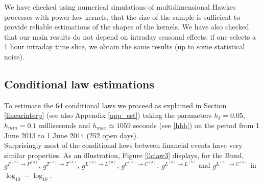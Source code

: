 \documentclass[a4paper,11pt]{article}
\newcommand{\PA}{P^{(a)}}
\newcommand{\PB}{P^{(b)}}
\newcommand{\TA}{T^{(a)}}
\newcommand{\CA}{C^{(a)}}
\newcommand{\LA}{L^{(a)}}
\newcommand{\LB}{L^{(b)}}
\begin{document}
\noindent We have checked using numerical simulations of multidimensional Hawkes processes with power-law kernels, that the size of the sample is sufficient to provide reliable estimations of the shapes of the kernels. We have also checked that our main results do not depend on intraday seasonal effects: if one selects a 1 hour intraday time slice, we obtain the same results (up to some statistical noise).



\subsection{Conditional law estimations}
\label{sec:claw}
To estimate the 64 conditional laws we proceed as explained in
Section \ref{linearinterp} (see also
Appendix \ref{app_est}) taking the parameters $h_\delta=0.05$, $h_{min}=0.1$ milliseconds and $h_{max}\simeq 1059$ seconds (see \eqref{hhh})  on the period from 1 June 2013 to 1 June 2014 (252 open days).\\



\noindent Surprisingly most of the conditional laws between financial events have very similar properties. As an illustration, Figure \ref{llclaw3} displays, for the Bund, $g^{\PA\rightarrow \PB}$, $g^{\TA\rightarrow \TA}$, $g^{\LA\rightarrow \LA}$, $g^{\CA\rightarrow \CA}$, $g^{\LA\rightarrow \LB}$ and $g^{\LA\rightarrow \CA}$ in $\log_{10}-\log_{10}$.
\end{document}
